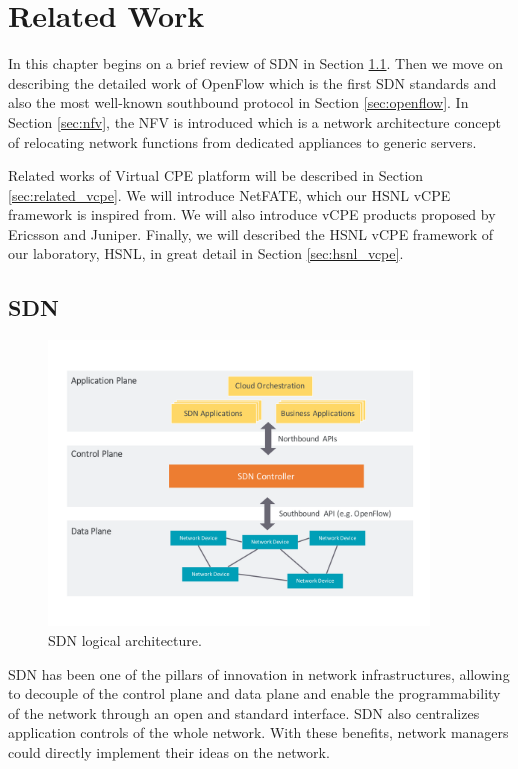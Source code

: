 \chapter{Related Work} \label{ch:related_work}

In this chapter begins on a brief review of SDN in Section \ref{sec:sdn}.
Then we move on describing the detailed work of OpenFlow which is the first SDN standards and also the most well-known southbound protocol in Section \ref{sec:openflow}.
In Section \ref{sec:nfv}, the NFV is introduced which is a network architecture concept of relocating network functions from dedicated appliances to generic servers.

Related works of Virtual CPE platform will be described in Section \ref{sec:related_vcpe}.
We will introduce NetFATE, which our HSNL vCPE framework is inspired from. We will also introduce vCPE products proposed by Ericsson and Juniper.
Finally, we will described the HSNL vCPE framework of our laboratory, HSNL, in great detail in Section \ref{sec:hsnl_vcpe}.





\section{SDN} \label{sec:sdn}

\begin{figure}[!ht]
\centering
\includegraphics[width=0.9\textwidth]{./fig/sdn_architecture}
\caption{SDN logical architecture.}
\label{fig:sdn_archi}
\end{figure}

SDN has been one of the pillars of innovation in network infrastructures, allowing to decouple of the control plane and data plane and enable the programmability of the network through an open and standard interface. \cite{sdn-define}
SDN also centralizes application controls of the whole network.
With these benefits, network managers could directly implement their ideas on the network.

